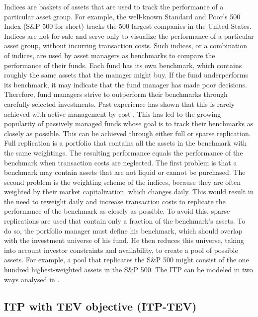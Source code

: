 \documentclass[
  oneside]{book}
\begin{document}
Indices are baskets of assets that are used to track the performance of a particular asset group. For example, the well-known Standard and Poor's 500 Index (S\&P 500 for short) tracks the 500 largest companies in the United States. Indices are not for sale and serve only to visualize the performance of a particular asset group, without incurring transaction costs. Such indices, or a combination of indices, are used by asset managers as benchmarks to compare the performance of their funds. Each fund has its own benchmark, which contains roughly the same assets that the manager might buy. If the fund underperforms its benchmark, it may indicate that the fund manager has made poor decisions. Therefore, fund managers strive to outperform their benchmarks through carefully selected investments. Past experience has shown that this is rarely achieved with active management by cost \citep{Desm2016}. This has led to the growing popularity of passively managed funds whose goal is to track their benchmarks as closely as possible. This can be achieved through either full or sparse replication. Full replication is a portfolio that contains all the assets in the benchmark with the same weightings. The resulting performance equals the performance of the benchmark when transaction costs are neglected. The first problem is that a benchmark may contain assets that are not liquid or cannot be purchased. The second problem is the weighting scheme of the indices, because they are often weighted by their market capitalization, which changes daily. This would result in the need to reweight daily and increase transaction costs to replicate the performance of the benchmark as closely as possible. To avoid this, sparse replications are used that contain only a fraction of the benchmark's assets. To do so, the portfolio manager must define his benchmark, which should overlap with the investment universe of his fund. He then reduces this universe, taking into account investor constraints and availability, to create a pool of possible assets. For example, a pool that replicates the S\&P 500 might consist of the one hundred highest-weighted assets in the S\&P 500. The ITP can be modeled in two ways analysed in \citep{IuGa2019}.

\hypertarget{itp-with-tev-objective-itp-tev}{%
\subsection{ITP with TEV objective (ITP-TEV)}\label{itp-with-tev-objective-itp-tev}}
\end{document}
